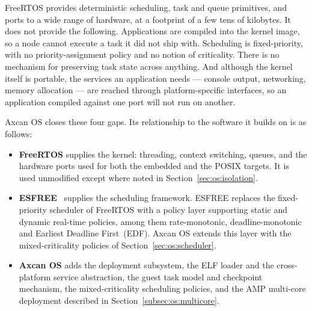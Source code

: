 FreeRTOS provides deterministic scheduling, task and queue primitives, and
ports to a wide range of hardware, at a footprint of a few tens of kilobytes.
It does not provide the following. Applications are compiled into the kernel
image, so a node cannot execute a task it did not ship with. Scheduling is
fixed-priority, with no priority-assignment policy and no notion of
criticality. There is no mechanism for preserving task state across anything.
And although the kernel itself is portable, the services an application needs
--- console output, networking, memory allocation --- are reached through
platform-specific interfaces, so an application compiled against one port will
not run on another.

Axcan OS closes these four gaps. Its relationship to the software it builds on
is as follows:

\begin{itemize}
  \item \textbf{FreeRTOS} supplies the kernel: threading,
    context switching, queues, and the hardware ports used for both the
    embedded and the POSIX targets. It is used unmodified except
    where noted in Section~\ref{sec:os:isolation}.

  \item \textbf{ESFREE}~\parencite{esfree} supplies the scheduling framework.
    ESFREE replaces the fixed-priority scheduler of FreeRTOS with a policy
    layer supporting static and dynamic real-time policies, among them
    rate-monotonic, deadline-monotonic and Earliest Deadline First~(EDF).
    Axcan OS extends this layer with the mixed-criticality policies of
    Section~\ref{sec:os:scheduler}.

  \item \textbf{Axcan OS} adds the deployment subsystem, the ELF loader and
    the cross-platform service abstraction, the guest task model and
    checkpoint mechanism, the mixed-criticality scheduling policies, and the
    AMP multi-core deployment described in
    Section~\ref{subsec:os:multicore}.
\end{itemize}

